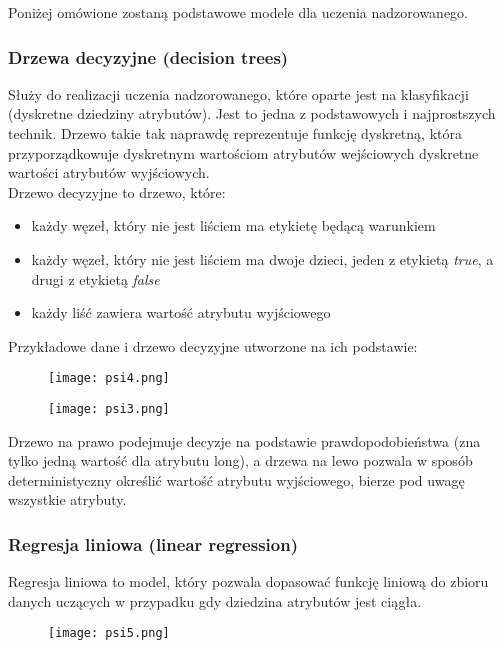 \documentclass[a4paper,15pt]{article}
\begin{document}
Poniżej omówione zostaną podstawowe modele dla uczenia nadzorowanego. 

\subsubsection{Drzewa decyzyjne (decision trees)}
Służy do realizacji uczenia nadzorowanego, które oparte jest na klasyfikacji (dyskretne dziedziny atrybutów). Jest to jedna z podstawowych i najprostszych technik. Drzewo takie tak naprawdę reprezentuje funkcję dyskretną, która przyporządkowuje dyskretnym wartościom atrybutów wejściowych dyskretne wartości atrybutów wyjściowych. \\
Drzewo decyzyjne to drzewo, które:
\begin{itemize}
\item każdy węzeł, który nie jest liściem ma etykietę będącą warunkiem 
\item każdy węzeł, który nie jest liściem ma dwoje dzieci, jeden z etykietą \textit{true}, a drugi z etykietą \textit{false}
\item każdy liść zawiera wartość atrybutu wyjściowego
\end{itemize}

Przykładowe dane i drzewo decyzyjne utworzone na ich podstawie:

\begin{figure}[H]
\centerline{\texttt{[image: psi4.png]}}
\end{figure}


\begin{figure}[H]
\centerline{\texttt{[image: psi3.png]}}
\end{figure}

Drzewo na prawo podejmuje decyzje na podstawie prawdopodobieństwa (zna tylko jedną wartość dla atrybutu long), a drzewa na lewo pozwala w sposób deterministyczny określić wartość atrybutu wyjściowego, bierze pod uwagę wszystkie atrybuty. 


\subsubsection{Regresja liniowa (linear regression)}

Regresja liniowa to model, który pozwala dopasować funkcję liniową do zbioru danych uczących w przypadku gdy dziedzina atrybutów jest ciągła. 

\begin{figure}[H]
\centerline{\texttt{[image: psi5.png]}}
\end{figure}
\end{document}
